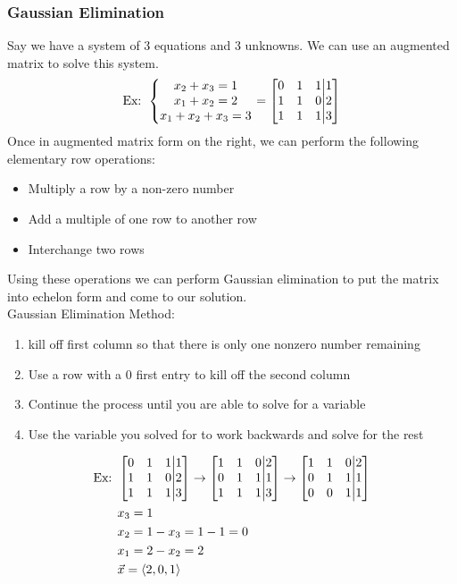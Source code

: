 \documentclass[11pt, fleqn]{article}
\begin{document}
\subsubsection{Gaussian Elimination}
Say we have a system of 3 equations and 3 unknowns. We can use an augmented matrix to solve this system.
\begin{align*}
    \text{Ex: }\eqnsystem{x_2+x_3=1\\x_1+x_2=2\\x_1+x_2+x_3=3}=\augmatrix{0&1&1\\1&1&0\\1&1&1}{1\\2\\3}
\end{align*}
Once in augmented matrix form on the right, we can perform the following elementary row operations:
\begin{itemize}
    \item Multiply a row by a non-zero number
    \item Add a multiple of one row to another row
    \item Interchange two rows
\end{itemize}
Using these operations we can perform Gaussian elimination to put the matrix into echelon form and come to our solution.\\
Gaussian Elimination Method:
\begin{enumerate}
    \item kill off first column so that there is only one nonzero number remaining
    \item Use a row with a 0 first entry to kill off the second column
    \item Continue the process until you are able to solve for a variable
    \item Use the variable you solved for to work backwards and solve for the rest
\end{enumerate}
\begin{align*}
    \text{Ex: }&\augmatrix{0&1&1\\1&1&0\\1&1&1}{1\\2\\3}\to\augmatrix{1&1&0\\0&1&1\\1&1&1}{2\\1\\3}\to\augmatrix{1&1&0\\0&1&1\\0&0&1}{2\\1\\1}\\
    &x_3=1\\
    &x_2=1-x_3=1-1=0\\
    &x_1=2-x_2=2\\
    &\vec{x}=\brangle{2,0,1}
\end{align*}
\end{document}

